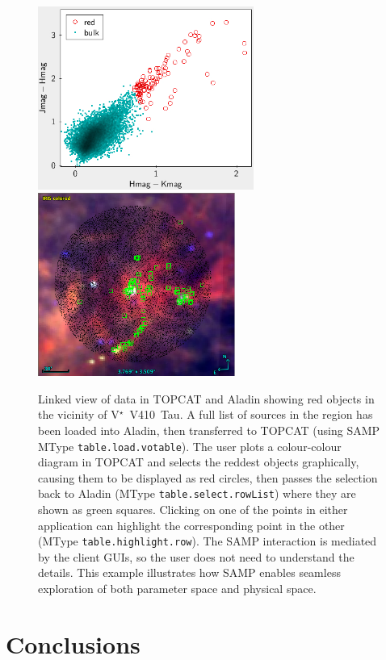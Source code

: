 \documentclass[5p]{elsarticle}
\begin{document}
\begin{figure}
\begin{center}
\includegraphics[height=6cm]{topcat-ir-b.png}
\hspace{1cm}
\includegraphics[height=6cm]{aladin-ir-b.png}
\end{center}
\caption{\label{fig:linked}
Linked view of data in TOPCAT and Aladin showing
red objects in the vicinity of V$^{\star}$~V410~Tau.
A full list of sources in the region has been loaded
into Aladin, then transferred to TOPCAT
(using SAMP MType {\tt table.load.votable}).
The user plots a colour-colour diagram in TOPCAT
and selects the reddest objects graphically,
causing them to be displayed as red circles,
then passes the selection back to Aladin
(MType {\tt table.select.rowList}) where
they are shown as green squares.
Clicking on one of the points in either application can
highlight the corresponding point in the other
(MType {\tt table.highlight.row}).
The SAMP interaction is mediated by the client GUIs,
so the user does not need to understand the details.
This example illustrates how SAMP enables seamless exploration of both
parameter space and physical space.
}
\end{figure}


\section{Conclusions} \label{sec:conclusion}
\end{document}

